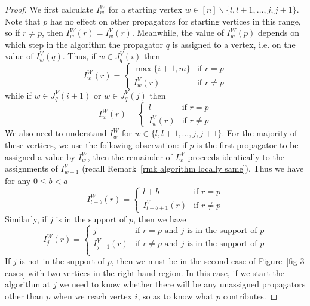 \documentclass[11pt]{article}
\theoremstyle{remark}
\theoremstyle{definition}
\begin{document}
\begin{proof}
We first calculate $I^{W}_w$ for a starting vertex ${w \in [n]\backslash \{l, l+1, \ldots,j,j+1\}}$. Note that $p$ has no effect on other propagators for starting vertices in this range, so if $r \neq p$, then $I_w^W(r) = I_w^V(r)$. Meanwhile, the value of $I^{W}_w(p)$ depends on which step in the algorithm the propagator $q$ is assigned to a vertex, i.e. on the value of $I^{V}_w(q)$. Thus, if $w\in J_q^{V}(i)$ then 
    \[
    I_w^{W}(r) =  \begin{cases}
        \max\{i+1, m\} & \text{if } r=p \\
        I_{w}^{V}(r) & \text{if } r\neq p
      \end{cases} 
    \]
    while if $w\in J_q^{V}(i+1)$ or $w\in J_q^{V}(j)$ then
    \[
    I_w^{W}(r) =  \begin{cases}
        l & \text{if } r=p \\
        I_{w}^{V}(r) & \text{if } r\neq p
      \end{cases} 
      \]
We also need to understand $I^{W}_w$ for $w \in \{l,l+1,\ldots,j,j+1\}$. For the majority 
of these vertices, we use the following observation: if $p$ is the first propagator to be assigned a value by $I_w^{W}$, then the remainder of $I_w^{W}$ proceeds identically to the assignments of $I^{V}_{w+1}$ (recall Remark~\ref{rmk algorithm locally same}).  Thus we have for any $0\leq b <a$
    \[
    I_{l+b}^{W}(r) = \begin{cases}
      l+b & \text{if } r=p\\
      I_{l+b+1}^{V}(r) & \text{if } r\neq p
    \end{cases}
    \]
Similarly, if $j$ is in the support of $p$, then we have
     \[
       I_j^{W}(r) = \begin{cases}
         j & \text{if $r=p$ and $j$ is in the support of $p$}\\
         I_{j+1}^{V}(r) & \text{if $r\neq p$ and $j$ is in the support of $p$}\\
       \end{cases}
       \]
If $j$ is not in the support of $p$, then we must be in the second case of Figure~\ref{fig 3 cases} with two vertices in the right hand region.  In this case, if we start the algorithm at $j$ we need to know whether there will be any unassigned propagators other than $p$ when we reach vertex $i$, so as to know what $p$ contributes.


\end{proof}
\end{document}
